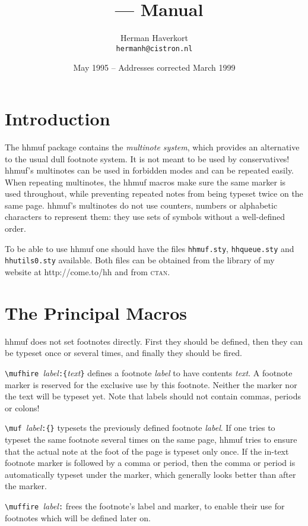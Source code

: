 \documentclass[11pt]{article}
\title{\hhmuf\ --- Manual}
\author{Herman Haverkort\\\normalsize\normalfont\texttt{hermanh@cistron.nl}}
\date{May 1995 -- Addresses corrected March 1999}
\def\packagename#1{{\sffamily #1}}     %
\def\hhmuf{\packagename{hhmuf}\xspace}
\def\={\verb=}
\begin{document}
\maketitle

\section{Introduction}

The \hhmuf package contains the {\em multinote system}, which provides
an alternative to the usual dull footnote system. It is not meant
to be used by conservatives! \hhmuf's multinotes can be used in
forbidden modes and can be repeated easily. When repeating multinotes,
the \hhmuf macros make sure the same marker is used throughout,
while preventing repeated notes from being typeset twice on the same
page. \hhmuf's multinotes do not use counters, numbers or alphabetic
characters to represent them: they use sets of symbols without a
well-defined order.

To be able to use \hhmuf one should have the files
\texttt{hhmuf.sty}, \texttt{hhqueue.sty} and \texttt{hhutils0.sty} available.
Both files can be obtained from the library of my website at
http://come.to/hh and from \textsc{ctan}.

\section{The Principal Macros}

\hhmuf does not set footnotes directly. First they should be defined,
then they can be typeset once or several times, and finally they should
be fired.

\=\mufhire =\textit{label}\=:{=\textit{text}\=}= defines a footnote
  \textit{label} to have contents \textit{text}. A footnote marker is
  reserved for the exclusive use by this footnote. Neither the marker
  nor the text will be typeset yet. Note that labels should
  not contain commas, periods or colons!

\=\muf =\textit{label}\=:{}= typesets the previously defined footnote
  \textit{label}. If one tries to typeset the same footnote several times
  on the same page, \hhmuf tries to ensure that the actual note
  at the foot of the page is typeset only once. If the in-text footnote
  marker is followed by a comma or period, then the comma or period is
  automatically typeset under the marker, which generally looks better
  than after the marker.

\=\muffire =\textit{label}\=:= frees the footnote's label and marker,
  to enable their use for footnotes which will be defined later on.
\end{document}
